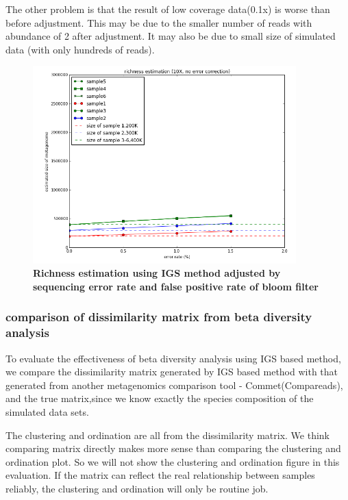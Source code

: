 \documentclass[12pt]{report}
\begin{document}
The other problem is that the result of low coverage data(0.1x) is worse than
before adjustment. This may be due to the smaller number of reads with 
abundance of 2 after adjustment. It may also be due to small size of simulated 
data (with only hundreds of reads).


\begin{figure}[!ht]
 \centerline{\includegraphics[width=4in]{./figures/IGS_richness_adjustment.png}}
\caption{\bf Richness estimation using IGS method adjusted by sequencing error
rate and false positive rate of bloom filter}
\label{fig:IGS_richness_adjustment}
\end{figure}

\subsubsection{comparison of dissimilarity matrix from beta diversity analysis}

To evaluate the effectiveness of beta diversity analysis using IGS based method, we compare the dissimilarity matrix generated by IGS based method with that generated from another metagenomics comparison tool - Commet(Compareads), and the true matrix,since we know exactly the species composition of the simulated data sets.

The clustering and ordination are all from the dissimilarity matrix. We think comparing matrix directly makes more sense than comparing the clustering and ordination plot. So we will not show the clustering and ordination figure in this evaluation. If the matrix can reflect the real relationship between samples reliably, the clustering and ordination will only be routine job.
\end{document}
